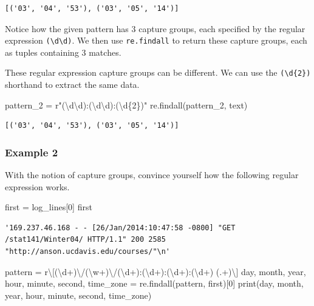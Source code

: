 \documentclass[
  letterpaper,
  DIV=11,
  numbers=noendperiod]{scrreprt}
\newenvironment{Shaded}{\begin{snugshade}}{\end{snugshade}}
\newcommand{\BuiltInTok}[1]{\textcolor[rgb]{0.00,0.23,0.31}{#1}}
\newcommand{\DecValTok}[1]{\textcolor[rgb]{0.68,0.00,0.00}{#1}}
\newcommand{\NormalTok}[1]{\textcolor[rgb]{0.00,0.23,0.31}{#1}}
\newcommand{\OperatorTok}[1]{\textcolor[rgb]{0.37,0.37,0.37}{#1}}
\newcommand{\SpecialCharTok}[1]{\textcolor[rgb]{0.37,0.37,0.37}{#1}}
\newcommand{\VerbatimStringTok}[1]{\textcolor[rgb]{0.13,0.47,0.30}{#1}}
\begin{document}
\begin{verbatim}
[('03', '04', '53'), ('03', '05', '14')]
\end{verbatim}

Notice how the given pattern has 3 capture groups, each specified by the
regular expression \texttt{(\textbackslash{}d\textbackslash{}d)}. We
then use \texttt{re.findall} to return these capture groups, each as
tuples containing 3 matches.

These regular expression capture groups can be different. We can use the
\texttt{(\textbackslash{}d\{2\})} shorthand to extract the same data.

\begin{Shaded}
\begin{Highlighting}[]
\NormalTok{pattern\_2 }\OperatorTok{=} \VerbatimStringTok{r"(\textbackslash{}d\textbackslash{}d):(\textbackslash{}d\textbackslash{}d):(\textbackslash{}d}\SpecialCharTok{\{2\}}\VerbatimStringTok{)"}
\NormalTok{re.findall(pattern\_2, text)}
\end{Highlighting}
\end{Shaded}

\begin{verbatim}
[('03', '04', '53'), ('03', '05', '14')]
\end{verbatim}

\hypertarget{example-2}{%
\subsubsection{Example 2}\label{example-2}}

With the notion of capture groups, convince yourself how the following
regular expression works.

\begin{Shaded}
\begin{Highlighting}[]
\NormalTok{first }\OperatorTok{=}\NormalTok{ log\_lines[}\DecValTok{0}\NormalTok{]}
\NormalTok{first}
\end{Highlighting}
\end{Shaded}

\begin{verbatim}
'169.237.46.168 - - [26/Jan/2014:10:47:58 -0800] "GET /stat141/Winter04/ HTTP/1.1" 200 2585 "http://anson.ucdavis.edu/courses/"\n'
\end{verbatim}

\begin{Shaded}
\begin{Highlighting}[]
\NormalTok{pattern }\OperatorTok{=} \VerbatimStringTok{r\textquotesingle{}\textbackslash{}[(\textbackslash{}d+)\textbackslash{}/(\textbackslash{}w+)\textbackslash{}/(\textbackslash{}d+):(\textbackslash{}d+):(\textbackslash{}d+):(\textbackslash{}d+) (.+)\textbackslash{}]\textquotesingle{}}
\NormalTok{day, month, year, hour, minute, second, time\_zone }\OperatorTok{=}\NormalTok{ re.findall(pattern, first)[}\DecValTok{0}\NormalTok{]}
\BuiltInTok{print}\NormalTok{(day, month, year, hour, minute, second, time\_zone)}
\end{Highlighting}
\end{Shaded}
\end{document}
